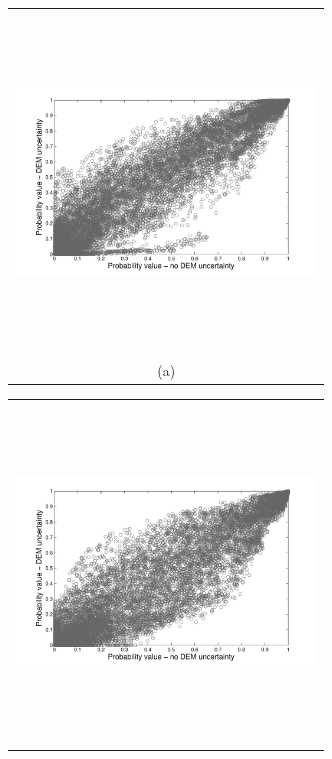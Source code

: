 \documentclass[12pt]{article}
\newcommand{\Pic}[2][0.85]{\begin{center}\texttt{[image: \#2]}
 \end{center} }
\begin{document}

\begin{figure}[H]
      \begin{minipage}[b]{0.6\textwidth}
        \begin{tabular}{c}
       \includegraphics[width=8cm,height=9cm,keepaspectratio]{Galeras_Aster_vs_meth0.pdf}\\
        (a)
        \end{tabular}
    \end{minipage}
    \begin{minipage}{0.6\textwidth}
        \begin{tabular}{c}
	\includegraphics[width=8cm,height=9cm,keepaspectratio]{Galeras_Aster_vs_meth3.pdf}\\

\end{tabular}
\end{minipage}
\end{figure}
\end{document}
